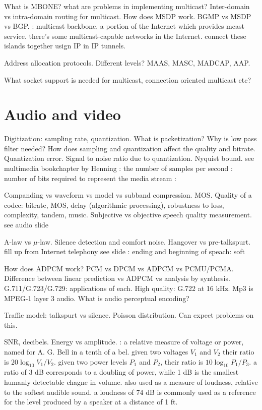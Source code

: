 \documentclass{myart}
\begin{document}
\w What is MBONE? what are problems in implementing multicast?
Inter-domain vs intra-domain routing for multicast. How does MSDP work.
BGMP vs MSDP vs BGP.
	\bit	
	\w {}: multicast backbone. 
	a portion of the Internet which provides
	mcast service. there's some multicast-capable networks in the
	Internet. connect these islands together usign IP in IP tunnels.
	\w 
	\eit

\w Address allocation protocols. Different levels? MAAS, MASC, MADCAP, AAP.

\w What socket support is needed for multicast, connection oriented
multicast etc?

\een

\section*{Audio and video}
\ben
\w Digitization: sampling rate, quantization. What is packetization?
Why is low pass filter needed? How does sampling and quantization
affect the quality and bitrate. Quantization error. Signal to noise
ratio due to quantization. Nyquist bound.
	\bit
	\w see multimedia bookchapter by Henning
	\w {}: the number of samples per second
	\w {}: number of bits required to represent the
		media stream
	\w {}: 
	\eit

\w Companding vs waveform vs model vs subband
compression. MOS. Quality of a codec: bitrate, MOS, delay
(algorithmic processing), robustness to loss, complexity, tandem, music.
Subjective vs objective speech quality measurement.
	\bit
	\w see audio slide
	\eit

\w A-law vs $\mu$-law. Silence detection and comfort noise. Hangover vs
pre-talkspurt.
	\bit
	\w fill up from Internet telephony
	\w see slide
	\w {}
	\w {}: ending and beginning of speach:
		soft
	\eit
 
\w How does ADPCM work? PCM vs DPCM vs ADPCM vs PCMU/PCMA. Difference
between linear prediction vs ADPCM vs analysis by
synthesis. G.711/G.723/G.729: applications of each. High quality:
G.722 at 16 kHz. Mp3 is MPEG-1 layer 3 audio. What is audio perceptual
encoding?
	\bit
	\w 
	\eit

\w Traffic model: talkspurt vs silence. Poisson distribution. Can
expect problems on this.

\w SNR, decibels. Energy vs amplitude.
	\bit
	\w {}: a relative measure of voltage or power, named for A. G.
		Bell in a tenth of a bel. given two voltages $V_1$ and $V_2$
		their ratio is $20\log_{10}V_1/V_2$. given two power
	levels $P_1$ and $P_2$, their ratio is $10\log_{10}P_1/P_3$.
	a ratio of 3 dB corresponds to a doubling of power, while 
	1 dB is the smallest humanly detectable chagne in volume.
	also used as a measure of loudness, relative to the softest
	audible sound. a loudness of 74 dB is commonly used as a reference
	for the level produced by a speaker at a distance of 1 ft.
	\eit
\end{document}
